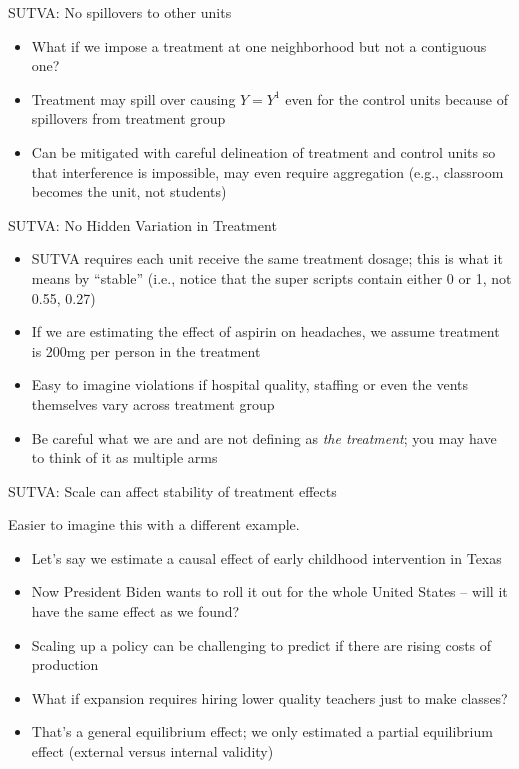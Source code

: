 \documentclass{beamer}
\begin{document}
\begin{frame}{SUTVA: No spillovers to other units}

  \begin{itemize}
    \item What if we impose a treatment at one neighborhood but not a contiguous one?
    \item Treatment may spill over causing $Y=Y^1$ even for the control units because of spillovers from treatment group
    \item Can be mitigated with careful delineation of treatment and control units so that interference is impossible, may even require aggregation (e.g., classroom becomes the unit, not students)
  \end{itemize}
\end{frame}



\begin{frame}{SUTVA: No Hidden Variation in Treatment}

  \begin{itemize}
    \item SUTVA requires each unit receive the same treatment dosage; this is what it means by ``stable'' (i.e., notice that the super scripts contain either 0 or 1, not 0.55, 0.27)
    \item If we are estimating the effect of aspirin on headaches, we assume treatment is 200mg per person in the treatment
    \item Easy to imagine violations if hospital quality, staffing or even the vents themselves vary across treatment group
    \item Be careful what we are and are not defining as \emph{the treatment}; you may have to think of it as multiple arms
  \end{itemize}
\end{frame}

\begin{frame}{SUTVA: Scale can affect stability of treatment effects}

  Easier to imagine this with a different example.
  \begin{itemize}
    \item Let's say we estimate a causal effect of early childhood intervention in Texas
    \item Now President Biden wants to roll it out for the whole United States -- will it have the same effect as we found?
    \item Scaling up a policy can be challenging to predict if there are rising costs of production
    \item What if expansion requires hiring lower quality teachers just to make classes?
    \item That's a general equilibrium effect; we only estimated a partial equilibrium effect (external versus internal validity)
  \end{itemize}
\end{frame}
% 
\end{document}
